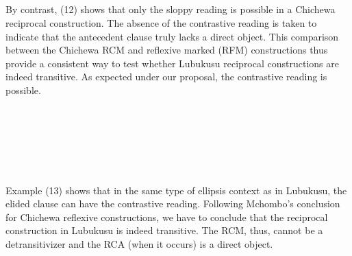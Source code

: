 \begin{listWWviiiNumxlileveli}
\item \ea\label{ex:}
\\
\ea\label{ex:}
\\
\ea\label{ex:}
\\
\ea\label{ex:}
\\
\end{listWWviiiNumxlileveli}

By contrast, (12) shows that only the sloppy reading is possible in a Chichewa reciprocal construction. The absence of the contrastive reading is taken to indicate that the antecedent clause truly lacks a direct object. This comparison between the Chichewa RCM and reflexive marked (RFM) constructions thus provide a consistent way to test whether Lubukusu reciprocal constructions are indeed transitive. As expected under our proposal, the contrastive reading is possible.

\begin{listWWviiiNumxlileveli}
\item \ea\label{ex:}
\\
\ea\label{ex:}
\\
\ea\label{ex:}
\\
\ea\label{ex:}
\\
\ea\label{ex:}
\\
\end{listWWviiiNumxlileveli}

Example (13) shows that in the same type of ellipsis context as in Lubukusu, the elided clause can have the contrastive reading. Following Mchombo's conclusion for Chichewa reflexive constructions, we have to conclude that the reciprocal construction in Lubukusu is indeed transitive. The RCM, thus, cannot be a detransitivizer and the RCA (when it occurs) is a direct object.

